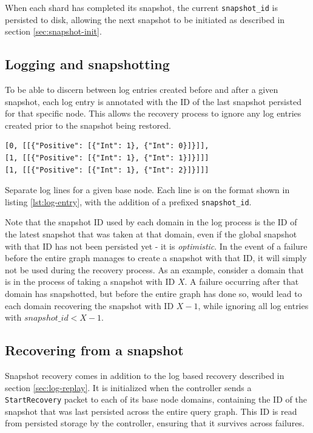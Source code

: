 \documentclass[b5paper]{report}
\begin{document}
When each shard has completed its snapshot, the current \texttt{snapshot\_id} is
persisted to disk, allowing the next snapshot to be initiated as described in
section \ref{sec:snapshot-init}.

\subsection{Logging and snapshotting}
To be able to discern between log entries created before and after a given snapshot,
each log entry is annotated with the ID of the last snapshot persisted for that
specific node. This allows the recovery process to ignore any log entries
created prior to the snapshot being restored.

\begin{listing}[H]
  \begin{verbatim}
[0, [[{"Positive": [{"Int": 1}, {"Int": 0}]}]],
[1, [[{"Positive": [{"Int": 1}, {"Int": 1}]}]]]
[1, [[{"Positive": [{"Int": 1}, {"Int": 2}]}]]]
  \end{verbatim}
  \caption{
    Separate log lines for a given base node. Each line is on the format shown
    in listing \ref{lst:log-entry}, with the addition of a prefixed
    \texttt{snapshot\_id}.
  }
\end{listing}

Note that the snapshot ID used by each domain in the log process is the ID of
the latest snapshot that was taken at that domain, even if the global snapshot
with that ID has not been persisted yet - it is \textit{optimistic}. In the
event of a failure before the entire graph manages to create a snapshot with
that ID, it will simply not be used during the recovery process. As an example,
consider a domain that is in the process of taking a snapshot with ID $ X $. A
failure occurring after that domain has snapshotted, but before the entire graph
has done so, would lead to each domain recovering the snapshot with ID $ X - 1
$, while ignoring all log entries with $ snapshot\_id < X - 1 $.

\subsection{Recovering from a snapshot}
Snapshot recovery comes in addition to the log based recovery described in
section \ref{sec:log-replay}. It is initialized when the controller sends a
\texttt{StartRecovery} packet to each of its base node domains, containing the
ID of the snapshot that was last persisted across the entire query graph. This
ID is read from persisted storage by the controller, ensuring that it survives
across failures.
\end{document}
